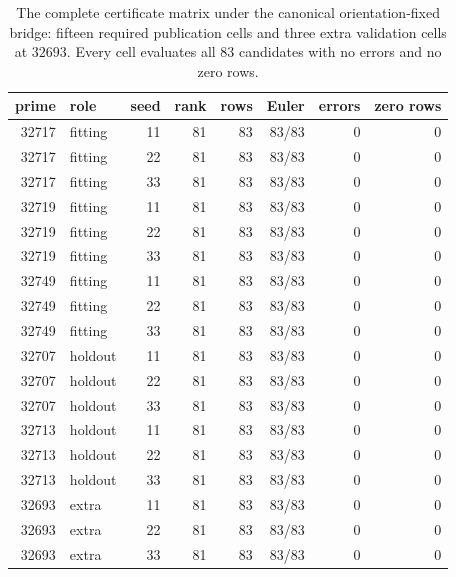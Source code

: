 \begin{table}[t]
\centering
\small
\begin{tabular}{rlrrrrrr}
\hline
prime & role & seed & rank & rows & Euler & errors & zero rows \\
\hline
32717 & fitting & 11 & 81 & 83 & 83/83 & 0 & 0 \\
32717 & fitting & 22 & 81 & 83 & 83/83 & 0 & 0 \\
32717 & fitting & 33 & 81 & 83 & 83/83 & 0 & 0 \\
32719 & fitting & 11 & 81 & 83 & 83/83 & 0 & 0 \\
32719 & fitting & 22 & 81 & 83 & 83/83 & 0 & 0 \\
32719 & fitting & 33 & 81 & 83 & 83/83 & 0 & 0 \\
32749 & fitting & 11 & 81 & 83 & 83/83 & 0 & 0 \\
32749 & fitting & 22 & 81 & 83 & 83/83 & 0 & 0 \\
32749 & fitting & 33 & 81 & 83 & 83/83 & 0 & 0 \\
32707 & holdout & 11 & 81 & 83 & 83/83 & 0 & 0 \\
32707 & holdout & 22 & 81 & 83 & 83/83 & 0 & 0 \\
32707 & holdout & 33 & 81 & 83 & 83/83 & 0 & 0 \\
32713 & holdout & 11 & 81 & 83 & 83/83 & 0 & 0 \\
32713 & holdout & 22 & 81 & 83 & 83/83 & 0 & 0 \\
32713 & holdout & 33 & 81 & 83 & 83/83 & 0 & 0 \\
32693 & extra & 11 & 81 & 83 & 83/83 & 0 & 0 \\
32693 & extra & 22 & 81 & 83 & 83/83 & 0 & 0 \\
32693 & extra & 33 & 81 & 83 & 83/83 & 0 & 0 \\
\hline
\end{tabular}
\caption{The complete certificate matrix under the canonical orientation-fixed bridge: fifteen required publication cells and three extra validation cells at $32693$. Every cell evaluates all $83$ candidates with no errors and no zero rows.}
\label{tab:matrix}
\end{table}
